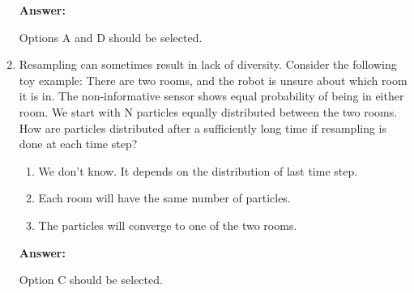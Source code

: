 \begin{enumerate}
\textbf{Answer:}

Options A and D should be selected.
\item Resampling can sometimes result in lack of diversity.
Consider the following toy example: There are two rooms, and the robot is unsure about which room it is in. The non-informative sensor shows equal probability of being in either room. We start with N particles equally distributed between the two rooms. How are particles distributed after a sufficiently long time if resampling is done at each time step?

\begin{enumerate}
\item We don't know. It depends on the distribution of last time step. 
\item Each room will have the same number of particles. 
\item The particles will converge to one of the two rooms.   
\end{enumerate}

\textbf{Answer:}

Option C should be selected.
\end{enumerate}

